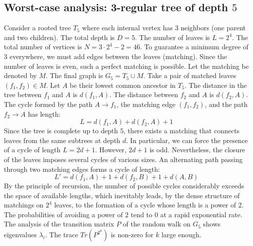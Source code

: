 \documentclass[11pt,a4paper]{article}
\begin{document}
\subsection{Worst-case analysis: 3-regular tree of depth $5$}
Consider a rooted tree $T_{5}$ where each internal vertex has 3 neighbors (one parent and two children).
The total depth is $D = 5$.
The number of leaves is $L = 2^{4}$.
The total number of vertices is $N = 3 \cdot 2^{4} - 2 = 46$.
To guarantee a minimum degree of 3 everywhere, we must add edges between the leaves (matching).
Since the number of leaves is even, such a perfect matching is possible.
Let the matching be denoted by $M$. The final graph is $G_{5} = T_{5} \cup M$.
Take a pair of matched leaves $(f_1, f_2) \in M$.
Let $A$ be their lowest common ancestor in $T_{5}$.
The distance in the tree between $f_1$ and $A$ is $d(f_1, A)$.
The distance between $f_2$ and $A$ is $d(f_2, A)$.
The cycle formed by the path $A \to f_1$, the matching edge $(f_1, f_2)$, and the path $f_2 \to A$ has length:
$$ L = d(f_1, A) + d(f_2, A) + 1 $$
Since the tree is complete up to depth $5$, there exists a matching that connects leaves from the same subtrees at depth $d$.
In particular, we can force the presence of a cycle of length $L = 2d + 1$. However, $2d+1$ is odd.
Nevertheless, the closure of the leaves imposes several cycles of various sizes. An alternating path passing through two matching edges forms a cycle of length:
$$ L' = d(f_1, A) + 1 + d(f_2, B) + 1 + d(A, B) $$
By the principle of recursion, the number of possible cycles considerably exceeds the space of available lengths, which inevitably leads, by the dense structure of matchings on $2^{4}$ leaves, to the formation of a cycle whose length is a power of 2. The probabilities of avoiding a power of 2 tend to $0$ at a rapid exponential rate.
The analysis of the transition matrix $P$ of the random walk on $G_{5}$ shows eigenvalues $\lambda_i$. The trace $Tr(P^{2^k})$ is non-zero for $k$ large enough.
\end{document}
